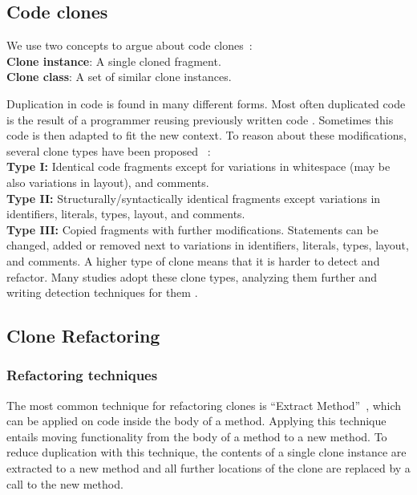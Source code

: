 \documentclass[a4paper,UKenglish,cleveref, autoref, thm-restate,authorcolumns]{lipics-v2019}
\begin{document}
\subsection{Code clones}
We use two concepts to argue about code clones~\cite{roy2007survey}:
\\ \textbf{Clone instance}: A single cloned fragment.
\\ \textbf{Clone class}: A set of similar clone instances.

Duplication in code is found in many different forms. Most often duplicated code is the result of a programmer reusing previously written code \cite{haefliger2008code, baxter1998clone}. Sometimes this code is then adapted to fit the new context. To reason about these modifications, several clone types have been proposed%
~\cite{roy2007survey}:\\
\textbf{Type I:} Identical code fragments except for variations in whitespace (may be also variations in layout), and comments.\\
\textbf{Type II:} Structurally/syntactically identical fragments except variations in identifiers, literals, types, layout, and comments.\\
\textbf{Type III:} Copied fragments with further modifications. Statements can be changed, added or removed next to variations in identifiers, literals, types, layout, and comments.
A higher type of clone means that it is harder to detect and refactor. Many studies adopt these clone types, analyzing them further and writing detection techniques for them \cite{sajnani2016sourcerercc, kodhai2010detection, van2019novel}.

\subsection{Clone Refactoring}
\subsubsection{Refactoring techniques}
The most common technique for refactoring clones is ``Extract Method''~\cite{fowler2018refactoring}, which can be applied on code inside the body of a method. Applying this technique entails moving functionality from the body of a method to a new method. To reduce duplication with this technique, the contents of a single clone instance are extracted to a new method and all further locations of the clone are replaced by a call to the new method.
\end{document}
